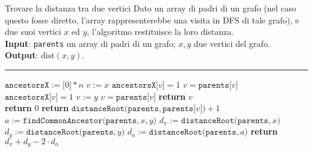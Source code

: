 \documentclass[a4paper, 12pt]{report}
\begin{document}
    \begin{framedalgo}[breakable]{Trovare la distanza tra due vertici}
        Dato un array di padri di un grafo (nel caso questo fosse diretto, l'array rappresenterebbe una visita in DFS di tale grafo), e due suoi vertici $x$ ed $y$, l'algoritmo restituisce la loro distanza.\\
        \textbf{Input}: \texttt{parents} un array di padri di un grafo; $x, y$ due vertici del grafo.\\
        \textbf{Output}: $\mathrm{dist}(x, y)$.

        \hrule
        \begin{algorithmic}[1]
                \State $\texttt{ancestorsX} := \texttt{[}0\texttt{]} * n$
                \State $v := x$
                    \State $\texttt{ancestorsX[}v\texttt{]} = 1$
                    \State $v = \texttt{parents[}v\texttt{]}$
                \EndWhile
                \State $\texttt{ancestorsX[}v\texttt{]} = 1$
                \State $v := y$
                    \State $v = \texttt{parents[}v\texttt{]}$
                \EndWhile
                \State \textbf{return} $v$
            \EndFunction
            \\
                    \State \textbf{return} $0$
                \Else
                \State \textbf{return} $\texttt{distanceRoot(parents}, \texttt{parents[}v\texttt{])} + 1$
                \EndIf
            \EndFunction
            \\
                \State $a := \texttt{findCommonAncestor(parents}, x, y\texttt{)}$
                \State $d_x := \texttt{distanceRoot(parents}, x\texttt{)}$
                \State $d_y := \texttt{distanceRoot(parents}, y\texttt{)}$
                \State $d_a := \texttt{distanceRoot(parents}, a\texttt{)}$
                \State \textbf{return} $d_x + d_y - 2 \cdot d_a$
            \EndFunction
        \end{algorithmic}
    \end{framedalgo}
\end{document}
